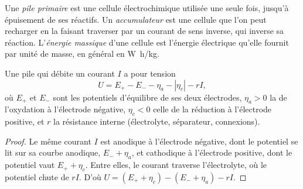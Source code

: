 \begin{definition}\label{def:b2:batteries-electrolysis:battery}
Une \emph{pile primaire} est une cellule électrochimique utilisée
une seule fois, jusqu'à épuisement de ses réactifs. Un \emph{accumulateur}
est une cellule que l'on peut recharger en la faisant traverser par un courant de
sens inverse, qui inverse sa réaction. L'\emph{énergie
massique} d'une cellule est l'énergie électrique qu'elle fournit
par unité de masse, en général en \unit{W.h/kg}.
\end{definition}

\begin{proposition}\label{prop:b2:batteries-electrolysis:delivering}
Une pile qui débite un courant $I$ a pour tension
\[
  U = E_+ - E_- - \eta_a - |\eta_c| - rI ,
\]
où $E_+$ et $E_-$ sont les potentiels d'équilibre de ses deux électrodes,
$\eta_a > 0$ la  de l'oxydation à l'électrode négative,
$\eta_c < 0$ celle de la réduction à l'électrode positive, et $r$ la
résistance interne (électrolyte, séparateur, connexions).
\end{proposition}

\begin{proof}
Le même courant $I$ est anodique à l'électrode négative, dont le potentiel se
lit sur sa courbe anodique, $E_- + \eta_a$, et cathodique à l'électrode positive,
dont le potentiel vaut $E_+ + \eta_c$. Entre elles, le courant traverse
l'électrolyte, où le potentiel chute de $rI$. D'où $U = (E_+ + \eta_c) - (E_- +
\eta_a) - rI$.
\end{proof}

